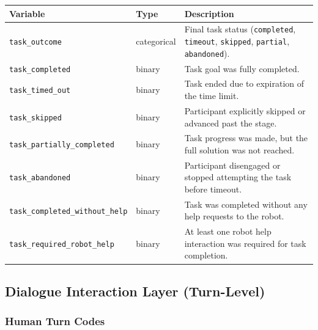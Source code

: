 \documentclass[
  letterpaper,
  DIV=11,
  numbers=noendperiod]{scrartcl}
\begin{document}
\begin{longtable}[]{@{}
  >{\raggedright\arraybackslash}p{}
  >{\raggedright\arraybackslash}p{}
  >{\raggedright\arraybackslash}p{}@{}}
\toprule\noalign{}
\begin{minipage}[b]{\linewidth}\raggedright
Variable
\end{minipage} & \begin{minipage}[b]{\linewidth}\raggedright
Type
\end{minipage} & \begin{minipage}[b]{\linewidth}\raggedright
Description
\end{minipage} \\
\midrule\noalign{}
\endhead
\bottomrule\noalign{}
\endlastfoot
\texttt{task\_outcome} & categorical & Final task status
(\texttt{completed}, \texttt{timeout}, \texttt{skipped},
\texttt{partial}, \texttt{abandoned}). \\
\texttt{task\_completed} & binary & Task goal was fully completed. \\
\texttt{task\_timed\_out} & binary & Task ended due to expiration of the
time limit. \\
\texttt{task\_skipped} & binary & Participant explicitly skipped or
advanced past the stage. \\
\texttt{task\_partially\_completed} & binary & Task progress was made,
but the full solution was not reached. \\
\texttt{task\_abandoned} & binary & Participant disengaged or stopped
attempting the task before timeout. \\
\texttt{task\_completed\_without\_help} & binary & Task was completed
without any help requests to the robot. \\
\texttt{task\_required\_robot\_help} & binary & At least one robot help
interaction was required for task completion. \\
\end{longtable}

\subsection{Dialogue Interaction Layer
(Turn-Level)}\label{dialogue-interaction-layer-turn-level}

\subsubsection*{Human Turn Codes}\label{human-turn-codes}
\end{document}
